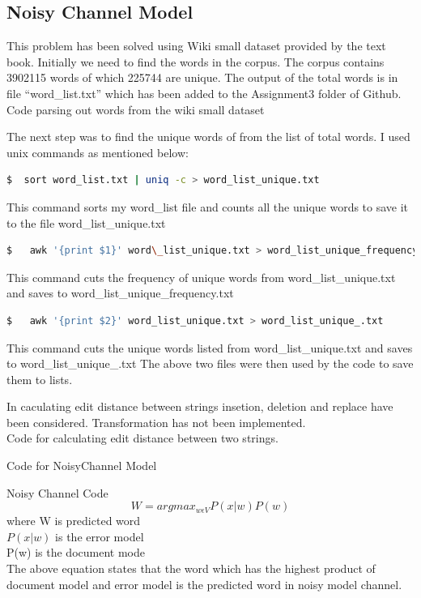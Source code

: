 \documentclass[12pt]{report}
\begin{document}
\subsection{Noisy Channel Model}
This problem has been solved using Wiki small dataset provided by the text book. Initially we need to find the words in the corpus. The corpus contains 3902115 words of which 225744 are unique. The output of the total words  is in file ``word\_list.txt'' which has been added to the Assignment3 folder of Github.\\
Code parsing out words from the wiki small dataset

The next step was to find the unique words of from the list of total words. I used unix commands  as mentioned below:
\begin{lstlisting}[language=bash]
  $  sort word_list.txt | uniq -c > word_list_unique.txt 
\end{lstlisting}
This command sorts my word\_list file and counts all the unique words to save it to the file word\_list\_unique.txt
\begin{lstlisting}[language=bash]
  $   awk '{print $1}' word\_list_unique.txt > word_list_unique_frequency.txt 
\end{lstlisting}
This command cuts the frequency of unique words from word\_list\_unique.txt and saves to word\_list\_unique\_frequency.txt
\begin{lstlisting}[language=bash]
  $   awk '{print $2}' word_list_unique.txt > word_list_unique_.txt
\end{lstlisting}
This command cuts the unique words listed from word\_list\_unique.txt and saves to word\_list\_unique\_.txt
The above two files were then used by the code to save them to lists.

In caculating edit distance between strings insetion, deletion and replace have been considered. Transformation has not been implemented. \\
Code for calculating edit distance between two strings.

Code for NoisyChannel Model

Noisy Channel Code
\[W = argmax_{w \epsilon V} P(x|w)P(w)\]
where W is  predicted word\\
$P(x|w)$ is the error model \\
P(w) is the document mode \\
The above equation states that the word which has the highest product of document model and  error model is the predicted word in noisy model channel. \\
\end{document}
